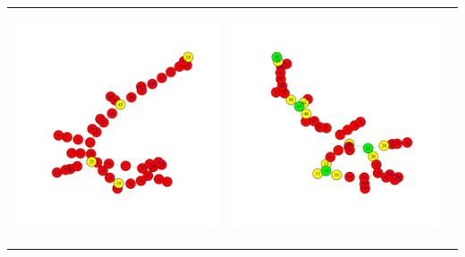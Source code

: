 \documentclass[eu,gi]{ifirak}\usepackage[]{graphicx}\usepackage[]{color}
\begin{document}
\begin{table}[hbt!]
\centering
\begin{tabular}{c c c}
\begin{center}
    \includegraphics[scale=0.3]{graph0.pdf}
\end{center}
&
\begin{center}
    \includegraphics[scale=0.3]{graph1.pdf}

\end{center}
\end{tabular}
\end{table}
\end{document}
